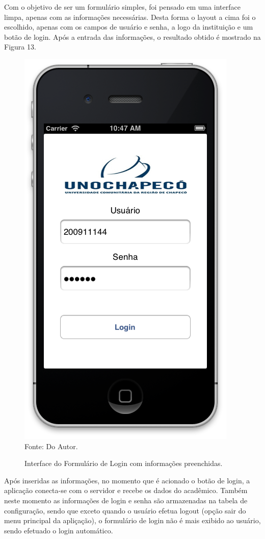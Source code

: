Com o objetivo de ser um formulário simples, foi pensado em uma interface limpa, apenas com as informações necessárias. Desta forma o layout a cima foi o escolhido, apenas com os campos de usuário e senha, a logo da instituição e um botão de login. Após a entrada das informações, o resultado obtido é mostrado na Figura 13.

\begin{figure}[!htb]
     \centering
     \caption[Formulário de Login - Interface com Informações]{Interface do Formulário de Login com informações preenchidas.}
     \includegraphics[scale=0.5]{imagens/formlogincomdados.png}
     \\  Fonte: Do Autor.
\end{figure}
\newpage

Após inseridas as informações, no momento que é acionado o botão de login, a aplicação conecta-se com o servidor e recebe os dados do acadêmico. Também neste momento as informações de login e senha são armazenadas na tabela de configuração, sendo que exceto quando o usuário efetua logout (opção sair do menu principal da apliçação), o formulário de login não é mais exibido ao usuário, sendo efetuado o login automático.

